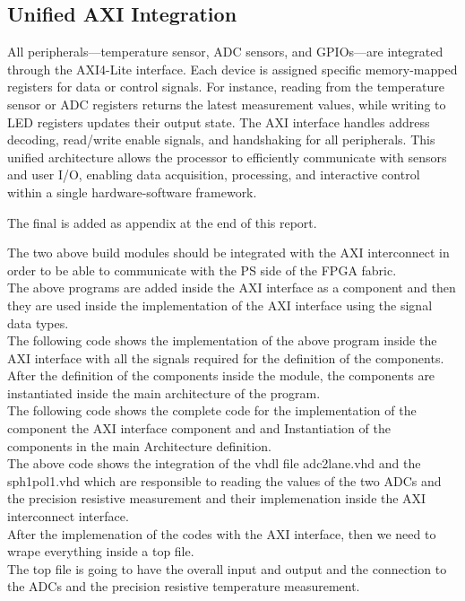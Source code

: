 \subsection{Unified AXI Integration}

All peripherals—temperature sensor, ADC sensors, and GPIOs—are integrated through the AXI4-Lite interface. Each device is assigned specific memory-mapped registers for data or control signals. For instance, reading from the temperature sensor or ADC registers returns the latest measurement values, while writing to LED registers updates their output state. The AXI interface handles address decoding, read/write enable signals, and handshaking for all peripherals. This unified architecture allows the processor to efficiently communicate with sensors and user I/O, enabling data acquisition, processing, and interactive control within a single hardware-software framework.

The final is added as appendix at the end of this report. 

The two above build modules should be integrated with the AXI interconnect in order to be able to communicate with the PS side of the FPGA fabric. \\
The above programs are added inside the AXI interface as a component and then they are used inside the implementation of the AXI interface using the signal data types. \\
The following code shows the implementation of the above program inside the AXI interface with all the signals required for the definition of the components. After the definition of the components inside the module, the components are instantiated inside the main architecture of the program.\\
The following code shows the complete code for the implementation of the component the AXI interface component and and Instantiation of the components in the main Architecture definition. \\

The above code shows the integration of the vhdl file adc2lane.vhd and the sph1pol1.vhd which are responsible to reading the values of the two ADCs and the precision resistive measurement and their implemenation inside the AXI interconnect interface. \\
After the implemenation of the codes with the AXI interface, then we need to wrape everything inside a top file. \\
The top file is going to have the overall input and output and the connection to the ADCs and the precision resistive temperature measurement. \\

